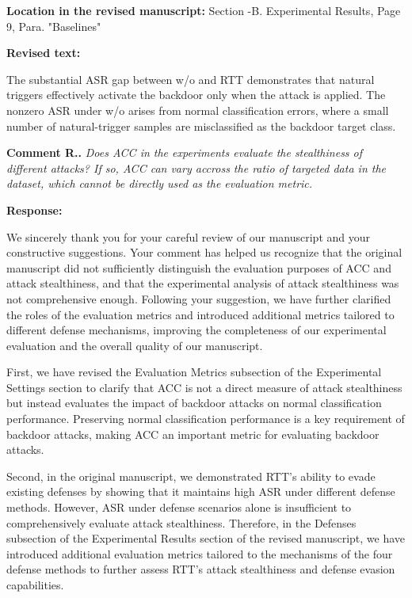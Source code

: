 \documentclass[11pt,a4paper]{article}
\newcommand{\manualindent}{\par\noindent\hspace*{1.5em}\ignorespaces}
\newcounter{reviewernum}
\newcounter{commentnum}
\newcommand{\reviewcomment}[1]{%
  \stepcounter{commentnum}%
  \begin{tcolorbox}[
      enhanced,breakable,colback=black!3,colframe=black!20,
      boxrule=0.5pt,arc=1.2mm,left=9pt,right=9pt,top=8pt,bottom=8pt]
    {\bfseries Comment R\arabic{reviewernum}.\arabic{commentnum}.}\quad
    {\itshape #1}
  \end{tcolorbox}%
}
\newcommand{\authorresponse}[1]{%
  {\bfseries\color{replyblue}Response:}\par
  #1\par\vspace{0.35em}%
}
\newcommand{\revisedtext}[2]{%
  {\bfseries\color{headingnavy}Location in the revised manuscript:} #1\par
  \begin{tcolorbox}[
      enhanced,breakable,colback=replyblue!3,colframe=replyblue!18,
      before upper={\setlength{\parskip}{6pt}},
      borderline west={2.5pt}{0pt}{replyblue},
      boxrule=0.5pt,arc=1mm,left=11pt,right=9pt,top=8pt,bottom=8pt]
    {\bfseries\color{headingnavy}Revised text:}\par
    #2
  \end{tcolorbox}
  \vspace{0.35em}%
}
\begin{document}
\revisedtext{Section \uppercase\expandafter{}-B. Experimental Results, Page 9, Para. "Baselines"}{\manualindent The substantial ASR gap between w/o and RTT demonstrates that natural triggers effectively activate the backdoor only when the attack is applied.
The nonzero ASR under w/o arises from normal classification errors, where a small number of natural-trigger samples are misclassified as the backdoor target class.}

\reviewcomment{ Does ACC in the experiments evaluate the stealthiness of different attacks? If so, ACC can vary accross the ratio of targeted data in the dataset, which cannot be directly used as the evaluation metric.}

\authorresponse{\manualindent We sincerely thank you for your careful review of our manuscript and your constructive suggestions.
Your comment has helped us recognize that the original manuscript did not sufficiently distinguish the evaluation purposes of ACC and attack stealthiness, and that the experimental analysis of attack stealthiness was not comprehensive enough.
Following your suggestion, we have further clarified the roles of the evaluation metrics and introduced additional metrics tailored to different defense mechanisms, improving the completeness of our experimental evaluation and the overall quality of our manuscript.

\manualindent First, we have revised the Evaluation Metrics subsection of the Experimental Settings section to clarify that ACC is not a direct measure of attack stealthiness but instead evaluates the impact of backdoor attacks on normal classification performance.
Preserving normal classification performance is a key requirement of backdoor attacks, making ACC an important metric for evaluating backdoor attacks.

\manualindent Second, in the original manuscript, we demonstrated RTT's ability to evade existing defenses by showing that it maintains high ASR under different defense methods.
However, ASR under defense scenarios alone is insufficient to comprehensively evaluate attack stealthiness.
Therefore, in the Defenses subsection of the Experimental Results section of the revised manuscript, we have introduced additional evaluation metrics tailored to the mechanisms of the four defense methods to further assess RTT's attack stealthiness and defense evasion capabilities.

}
\end{document}
